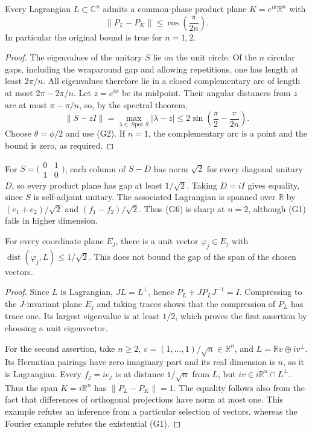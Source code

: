 \begin{proposition}\ours
Every Lagrangian \(L\subset\mathbb C^n\) admits a common-phase product
plane \(K=e^{i\theta}\mathbb R^n\) with
\[
 \|P_L-P_K\|\le\cos\!\left(\frac{\pi}{2n}\right). \tag{G6}
\]
In particular the original bound is true for \(n=1,2\).
\end{proposition}
\begin{proof}
The eigenvalues of the unitary \(S\) lie on the unit circle. Of the \(n\)
circular gaps, including the wraparound gap and allowing repetitions,
one has length at least \(2\pi/n\). All eigenvalues therefore lie in a
closed complementary arc of length at most \(2\pi-2\pi/n\).
Let \(z=e^{i\phi}\) be its midpoint. Their angular distances from \(z\)
are at most \(\pi-\pi/n\), so, by the spectral theorem,
\[
 \|S-zI\|=\max_{\lambda\in\operatorname{Spec}S}|\lambda-z|
 \le2\sin\!\left(\frac\pi2-\frac{\pi}{2n}\right).
\]
Choose \(\theta=\phi/2\) and use (G2). If \(n=1\), the complementary
arc is a point and the bound is zero, as required.
\end{proof}

\begin{example}\ours
For \(S=\bigl(\begin{smallmatrix}0&1\\1&0\end{smallmatrix}\bigr)\),
each column of \(S-D\) has norm \(\sqrt2\) for every diagonal unitary
\(D\), so every product plane has gap at least \(1/\sqrt2\).
Taking \(D=iI\) gives equality, since \(S\) is self-adjoint unitary.
The associated Lagrangian is spanned over \(\mathbb R\) by
\((e_1+e_2)/\sqrt2\) and \((f_1-f_2)/\sqrt2\).
Thus (G6) is sharp at \(n=2\), although (G1) fails in higher dimension.
\end{example}

\begin{proposition}\ours
For every coordinate plane \(E_j\), there is a unit vector
\(\varphi_j\in E_j\) with \(\operatorname{dist}(\varphi_j,L)\le1/\sqrt2\).
This does not bound the gap of the span of the chosen vectors.
\end{proposition}
\begin{proof}
Since \(L\) is Lagrangian, \(JL=L^\perp\), hence
\(P_L+JP_LJ^{-1}=I\). Compressing to the \(J\)-invariant plane \(E_j\)
and taking traces shows that the compression of \(P_L\) has trace one.
Its largest eigenvalue is at least \(1/2\), which proves the first
assertion by choosing a unit eigenvector.

For the second assertion, take \(n\ge2\),
\(v=(1,\ldots,1)/\sqrt n\in\mathbb R^n\), and
\(L=\mathbb Rv\oplus i v^\perp\). Its Hermitian pairings have zero
imaginary part and its real dimension is \(n\), so it is Lagrangian.
Every \(f_j=ie_j\) is at distance \(1/\sqrt n\) from \(L\), but
\(iv\in i\mathbb R^n\cap L^\perp\). Thus the span
\(K=i\mathbb R^n\) has \(\|P_L-P_K\|=1\). The equality follows also
from the fact that differences of orthogonal projections have norm at
most one. This example refutes an inference from a particular selection
of vectors, whereas the Fourier example refutes the existential (G1).
\end{proof}

